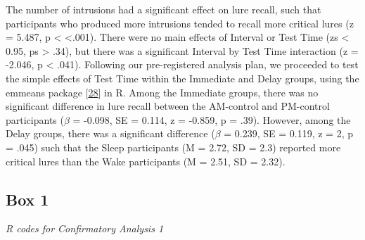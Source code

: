 \documentclass[
]{article}
\begin{document}
The number of intrusions had a significant effect on lure recall, such that participants who produced more intrusions tended to recall more critical lures (z = 5.487, p \textless{} \textless.001). There were no main effects of Interval or Test Time (zs \textless{} 0.95, ps \textgreater{} .34), but there was a significant Interval by Test Time interaction (z = -2.046, p \textless{} .041). Following our pre-registered analysis plan, we proceeded to test the simple effects of Test Time within the Immediate and Delay groups, using the emmeans package {[}\protect\hyperlink{ref-lenth2021a}{28}{]} in R. Among the Immediate groups, there was no significant difference in lure recall between the AM-control and PM-control participants (\(\beta\) = -0.098, SE = 0.114, z = -0.859, p = .39). However, among the Delay groups, there was a significant difference (\(\beta\) = 0.239, SE = 0.119, z = 2, p = .045) such that the Sleep participants (M = 2.72, SD = 2.3) reported more critical lures than the Wake participants (M = 2.51, SD = 2.32).

\hypertarget{box-1}{%
\subsection*{Box 1}\label{box-1}}

\emph{R codes for Confirmatory Analysis 1}
\end{document}
